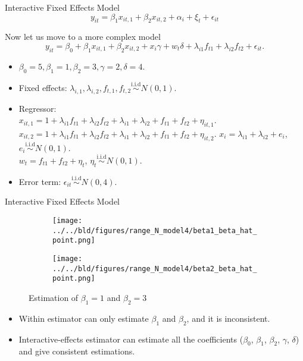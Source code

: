 \documentclass{beamer}
\begin{document}
\begin{frame}{Interactive Fixed Effects Model}
{\color{gray}\footnotesize \[
       y_{it} = \beta_{1}x_{it,1}+\beta_{2}x_{it,2}+\alpha_{i}+\xi_{t}+\epsilon_{it}
    \]}

Now let us move to a more complex model
$$
y_{it} = \beta_{0}+ \beta_{1}x_{it,1}+\beta_{2}x_{it,2}+x_{i}\gamma +w_{t}\delta +\lambda_{i1}f_{t1}+\lambda_{i2}f_{t2}+\epsilon_{it}.
$$

\begin{itemize}
    \item $\beta_0=5, \beta_{1}=1, \beta_{2}=3, \gamma=2,\delta=4$.
    \item Fixed effects: $\lambda_{i,1},\lambda_{i,2},f_{t,1},f_{t,2}\stackrel{\text{i.i.d}}{\sim}N(0,1)$.
    \item Regressor:\\
    $x_{it,1}= 1+\lambda_{i1}f_{t1}+\lambda_{i2}f_{t2}+\lambda_{i1}+\lambda_{i2}+f_{t1}+f_{t2}+\eta_{it,1}$.
    $x_{it,2}= 1+\lambda_{i1}f_{t1}+\lambda_{i2}f_{t2}+\lambda_{i1}+\lambda_{i2}+f_{t1}+f_{t2}+\eta_{it,2}$.
    $x_{i}=\lambda_{i1}+\lambda_{i2}+e_{i}$, $e_{i} \stackrel{\text{i.i.d}}{\sim} N(0,1)$.\\
    $w_{t}=f_{t1}+f_{t2}+\eta_{t}$, $\eta_{t} \stackrel{\text{i.i.d}}{\sim} N(0,1)$.
    \item Error term: $\epsilon_{it}\stackrel{\text{i.i.d}}{\sim}N(0,4)$.
\end{itemize}



\end{frame}


\begin{frame}{Interactive Fixed Effects Model}

\begin{figure}
\begin{subfigure}{.5\textwidth}
\centering
\texttt{[image: ../../bld/figures/range\_N\_model4/beta1\_beta\_hat\_point.png]}
\end{subfigure}%
\begin{subfigure}{.5\textwidth}
\centering
\texttt{[image: ../../bld/figures/range\_N\_model4/beta2\_beta\_hat\_point.png]}
\end{subfigure}%
\centering
\caption{Estimation of $\beta_1=1$ and $\beta_2=3$}
\end{figure}

\begin{itemize}
    \item Within estimator can only estimate $\beta_{1}$ and $\beta_{2}$, and it is inconsistent.
    \item Interactive-effects estimator can estimate all the coefficients ($\beta_{0}$, $\beta_{1}$, $\beta_{2}$, $\gamma$, $\delta$) and give consistent estimations.
\end{itemize}

\end{frame}
\end{document}
